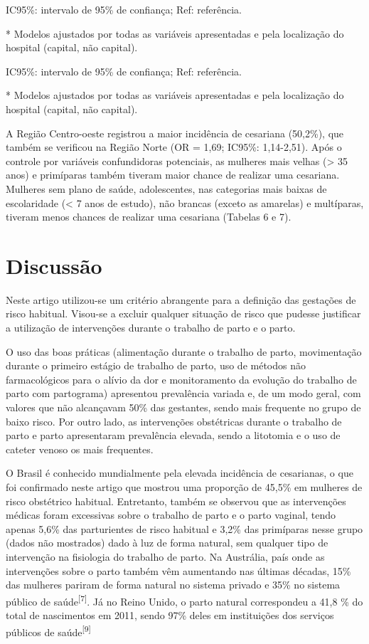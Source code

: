 \documentclass{article}
\begin{document}
IC95\%: intervalo de 95\% de confiança; Ref: referência.

* Modelos ajustados por todas as variáveis apresentadas e pela
localização do hospital (capital, não capital).

IC95\%: intervalo de 95\% de confiança; Ref: referência.

* Modelos ajustados por todas as variáveis apresentadas e pela
localização do hospital (capital, não capital).

A Região Centro-oeste registrou a maior incidência de cesariana (50,2\%), que
também
se verificou na Região Norte (OR = 1,69; IC95\%: 1,14-2,51). Após o controle por
variáveis confundidoras potenciais, as mulheres mais velhas (> 35 anos) e
primíparas também tiveram maior chance de realizar uma cesariana. Mulheres sem
plano
de saúde, adolescentes, nas categorias mais baixas de escolaridade (< 7 anos de
estudo), não brancas (exceto as amarelas) e multíparas, tiveram menos chances de
realizar uma cesariana (Tabelas 6 e 7).

\section{Discussão}

Neste artigo utilizou-se um critério abrangente para a definição das gestações
de
risco habitual. Visou-se a excluir qualquer situação de risco que pudesse
justificar
a utilização de intervenções durante o trabalho de parto e o parto.

O uso das boas práticas (alimentação durante o trabalho de parto, movimentação
durante o primeiro estágio de trabalho de parto, uso de métodos não
farmacológicos
para o alívio da dor e monitoramento da evolução do trabalho de parto com
partograma) apresentou prevalência variada e, de um modo geral, com valores que
não
alcançavam 50\% das gestantes, sendo mais frequente no grupo de baixo risco. Por
outro lado, as intervenções obstétricas durante o trabalho de parto e parto
apresentaram prevalência elevada, sendo a litotomia e o uso de cateter venoso os
mais frequentes.

O Brasil é conhecido mundialmente pela elevada incidência de cesarianas, o que
foi
confirmado neste artigo que mostrou uma proporção de 45,5\% em mulheres de risco
obstétrico habitual. Entretanto, também se observou que as intervenções médicas
foram excessivas sobre o trabalho de parto e o parto vaginal, tendo apenas 5,6\%
das
parturientes de risco habitual e 3,2\% das primíparas nesse grupo (dados não
mostrados) dado à luz de forma natural, sem qualquer tipo de intervenção na
fisiologia do trabalho de parto. Na Austrália, país onde as intervenções sobre o
parto também vêm aumentando nas últimas décadas, 15\% das mulheres pariram de
forma
natural no sistema privado e 35\% no sistema público de saúde\textsuperscript{[}\textsuperscript{7}\textsuperscript{]}. Já no Reino Unido, o parto natural correspondeu a
41,8 \% do total de nascimentos em 2011, sendo 97\% deles em instituições dos
serviços
públicos de saúde\textsuperscript{[}\textsuperscript{9}\textsuperscript{]}
\end{document}
